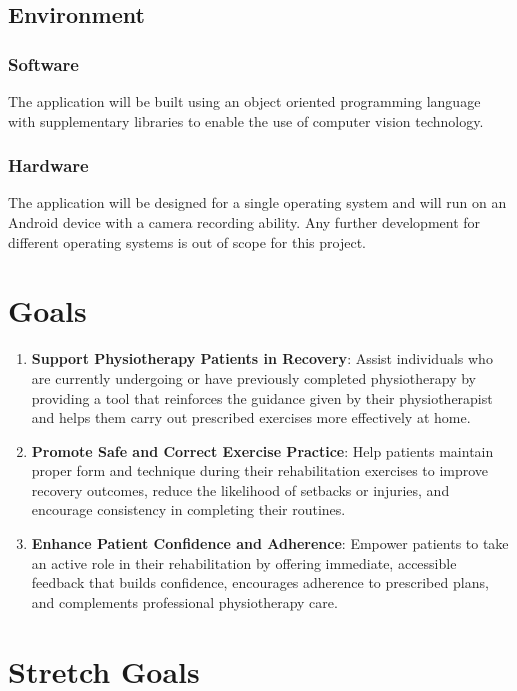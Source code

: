 \documentclass{article}
\begin{document}
\subsection{Environment}
  \subsubsection{Software}
    The application will be built using an object oriented programming language with supplementary libraries to enable the use of computer vision technology. \\
  \subsubsection{Hardware}
    The application will be designed for a single operating system and will run on an Android device with a camera recording ability. Any further development for different operating systems is out of scope for this project. 
    
\section{Goals}

\begin{enumerate}
  \item \textbf{Support Physiotherapy Patients in Recovery}: Assist individuals who are currently undergoing or have previously completed physiotherapy by providing a tool that reinforces the guidance given by their physiotherapist and helps them carry out prescribed exercises more effectively at home.

  \item \textbf{Promote Safe and Correct Exercise Practice}: Help patients maintain proper form and technique during their rehabilitation exercises to improve recovery outcomes, reduce the likelihood of setbacks or injuries, and encourage consistency in completing their routines.

  \item \textbf{Enhance Patient Confidence and Adherence}: Empower patients to take an active role in their rehabilitation by offering immediate, accessible feedback that builds confidence, encourages adherence to prescribed plans, and complements professional physiotherapy care.

\end{enumerate}

\section{Stretch Goals}
\end{document}
